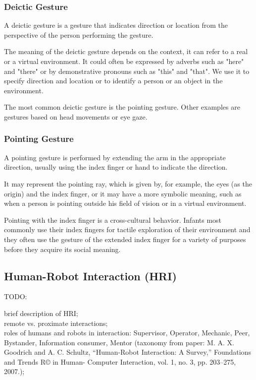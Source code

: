 \subsubsection{Deictic Gesture}
A deictic gesture is a gesture that indicates direction or location from the perspective of the person performing the gesture.\par
The meaning of the deictic gesture depends on the context, it can refer to a real or a virtual environment. It could often be expressed by adverbs such as "here" and "there" or by demonstrative pronouns such as "this" and "that". We use it to specify direction and location or to identify a person or an object in the environment.\par
The most common deictic gesture is the pointing gesture. Other examples are
gestures based on head movements or eye gaze.\par

\subsubsection{Pointing Gesture}
A pointing gesture is performed by extending the arm in the appropriate
direction, usually using the index finger or hand to indicate the direction.\par
It may represent the pointing ray, which is given by, for example,
the eyes (as the origin) and the index finger, or it may have a more symbolic
meaning, such as when a person is pointing outside his field of vision or in a virtual environment.\par
Pointing with the index finger is a cross-cultural behavior. Infants most commonly use their index fingers for tactile exploration of their environment and they often use the gesture of the extended
index finger for a variety of purposes before they acquire its social meaning.\par
 
\subsection{Human-Robot Interaction (HRI)}
TODO:\par
brief description of HRI; \\

remote vs. proximate interactions; \\

roles of humans and robots in interaction: Supervisor, Operator, Mechanic, Peer, Bystander, Information consumer, Mentor (taxonomy from paper: M. A. X. Goodrich and A. C. Schultz, “Human-Robot Interaction: A Survey,” Foundations and Trends R© in Human- Computer Interaction, vol. 1, no. 3, pp. 203–275, 2007.); \\

